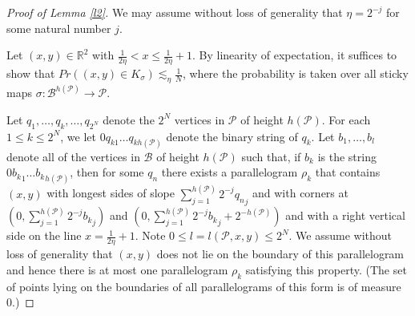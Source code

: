 \documentclass[12pt]{amsart}
\numberwithin{equation}{section}
\theoremstyle{definition}
\theoremstyle{remark}
\begin{document}
\begin{proof}[Proof of Lemma \ref{l2}]  We may assume without loss of generality that $\eta = 2^{-j}$ for some natural number $j$.

Let $(x,y) \in \mathbb{R}^2$ with $\frac{1}{2\eta} < x \leq \frac{1}{2\eta} + 1$.    By linearity of  expectation, it suffices to show that $Pr((x,y) \in K_\sigma) \lesssim_\eta \frac{1}{N}$, where the probability is taken over all sticky maps $\sigma: \mathscr{B}^{h(\mathscr{P})} \rightarrow \mathscr{P}$.

 Let $ q_1, \ldots, q_k, \ldots, q_{2^N}$ denote the $2^N$ vertices in $\mathscr{P}$ of height $h(\mathscr{P})$.  For each $1 \leq k \leq 2^{N}$, we let $0q_{k1}\ldots q_{k h(\mathscr{P})}$ denote the binary string of $q_k$.   Let $b_1, \ldots, b_l$ denote all of the vertices in $\mathscr{B}$ of height $h(\mathscr{P})$ such that, if $b_k$ is the string  $0 {b_{k}}_1 \ldots {b_{k}}_{h(\mathscr{P})}$, then for some $q_{n}$ there exists a  parallelogram $\rho_k$ that contains $(x,y)$ with longest sides of slope $\sum_{j = 1}^{h(\mathscr{P})}2^{-j}{q_{n}}_j$ and with corners at $(0, \sum_{j=1}^{h(\mathscr{P})}2^{-j}{b_k}_j)$ and \mbox{$(0, \sum_{j=1}^{h(\mathscr{P})}2^{-j}{b_{k}}_j + 2^{-h(\mathscr{P})}) $} and with a right vertical side on the line $x = \frac{1}{2\eta} + 1$.   Note $0 \leq l = l(\mathscr{P},x,y) \leq 2^N$.   We assume without loss of generality that $(x,y)$ does not lie on the boundary of this parallelogram and hence there is at most one parallelogram $\rho_k$ satisfying this property.   (The set of points lying on the boundaries of all parallelograms of this form is of measure 0.)  




\end{proof}
\end{document}

